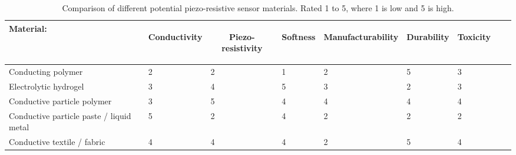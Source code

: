 \begin{table}[H]
		\centering
		\caption{Comparison of different potential piezo-resistive sensor materials. Rated 1 to 5, where 1 is low and 5 is high.}
		\label{tab:comparing-piezo-r-materials}
		\vspace{3cm}
		\begin{tabular}{|p{5cm}|p{1cm}|p{1cm}|p{1cm}|p{1cm}|p{1cm}|p{1cm}|p{1cm}|p{1cm}|}
			\multicolumn{1}{l}{\textbf{Material:}} & \multicolumn{1}{c}{\begin{rotate}{60} \hspace{0.1cm}\vspace{-2cm} \textbf{Conductivity} \end{rotate}} & 
			\multicolumn{1}{c}{\begin{rotate}{60} \hspace{0.2cm}\vspace{-2cm} \textbf{Piezo-resistivity} \end{rotate}} & 
			\multicolumn{1}{c}{\begin{rotate}{60} \hspace{0.2cm}\vspace{-2cm} \textbf{Softness} \end{rotate}} & 
			\multicolumn{1}{c}{\begin{rotate}{60} \hspace{0.2cm}\vspace{-2cm} \textbf{Manufacturability} \end{rotate}} & 
			\multicolumn{1}{c}{\begin{rotate}{60} \hspace{0.2cm}\vspace{-2cm} \textbf{Durability} \end{rotate}} & 
			\multicolumn{1}{c}{\begin{rotate}{60} \hspace{0.2cm}\vspace{-2cm} \textbf{Toxicity} \end{rotate}} \\ \hline
			
			Conducting polymer \cite{Guo2018,Hazelton2023,Bhattacharjee2020,Mukherjee2023} & 2 & 2 & 1 & 2 & 5 & 3 \\ \hline
			Electrolytic hydrogel \cite{Guo2018,Shen2022,Li2020a,Li2020b,Lu2014,Wang2018} & 3 & 4 & 5 & 3 & 2 & 3   \\ \hline
			Conductive particle polymer \cite{Princy1998,Spahr2017,Duan2014,Buketov2020} & 3 & 5 & 4 & 4 & 4 & 4 \\ \hline
			Conductive particle paste / liquid metal \cite{Chen2020a,Park2010,Jung2015} & 5 & 2 & 4 & 2 & 2 & 2 \\ \hline
			Conductive textile / fabric \cite{Jeong2020a,Yao2012,Rashid2022} & 4 & 4 & 4 & 2 & 5 & 4  \\ \hline
		\end{tabular}
\end{table}


